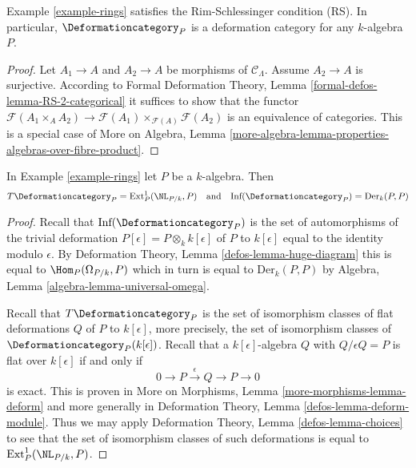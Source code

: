 \begin{lemma}
\label{lemma-rings-RS}
Example \ref{example-rings}
satisfies the Rim-Schlessinger condition (RS).
In particular, $\Deformationcategory_P$ is a deformation category
for any $k$-algebra $P$.
\end{lemma}

\begin{proof}
Let $A_1 \to A$ and $A_2 \to A$ be morphisms of $\mathcal{C}_\Lambda$.
Assume $A_2 \to A$ is surjective. According to
Formal Deformation Theory, Lemma
\ref{formal-defos-lemma-RS-2-categorical}
it suffices to show that the functor
$\mathcal{F}(A_1 \times_A A_2) \to
\mathcal{F}(A_1) \times_{\mathcal{F}(A)} \mathcal{F}(A_2)$
is an equivalence of categories.
This is a special case of More on Algebra, Lemma
\ref{more-algebra-lemma-properties-algebras-over-fibre-product}.
\end{proof}

\begin{lemma}
\label{lemma-rings-TI}
In Example \ref{example-rings} let $P$ be a $k$-algebra. Then
$$
T\Deformationcategory_P = \text{Ext}^1_P(\NL_{P/k}, P)
\quad\text{and}\quad
\text{Inf}(\Deformationcategory_P) = \text{Der}_k(P, P)
$$
\end{lemma}

\begin{proof}
Recall that $\text{Inf}(\Deformationcategory_P)$ is the set of
automorphisms of the trivial deformation
$P[\epsilon] = P \otimes_k k[\epsilon]$ of $P$ to $k[\epsilon]$
equal to the identity modulo $\epsilon$.
By Deformation Theory, Lemma \ref{defos-lemma-huge-diagram}
this is equal to $\Hom_P(\Omega_{P/k}, P)$ which in turn is
equal to $\text{Der}_k(P, P)$ by
Algebra, Lemma \ref{algebra-lemma-universal-omega}.

\medskip\noindent
Recall that $T\Deformationcategory_P$ is the set of isomorphism classes
of flat deformations $Q$ of $P$ to $k[\epsilon]$, more precisely,
the set of isomorphism classes of $\Deformationcategory_P(k[\epsilon])$.
Recall that a $k[\epsilon]$-algebra $Q$ with $Q/\epsilon Q = P$
is flat over $k[\epsilon]$ if and only if
$$
0 \to P \xrightarrow{\epsilon} Q \to P \to 0
$$
is exact. This is proven in More on Morphisms, Lemma
\ref{more-morphisms-lemma-deform} and more generally in
Deformation Theory, Lemma \ref{defos-lemma-deform-module}.
Thus we may apply
Deformation Theory, Lemma \ref{defos-lemma-choices}
to see that the set of isomorphism classes of such
deformations is equal to $\text{Ext}^1_P(\NL_{P/k}, P)$.
\end{proof}

